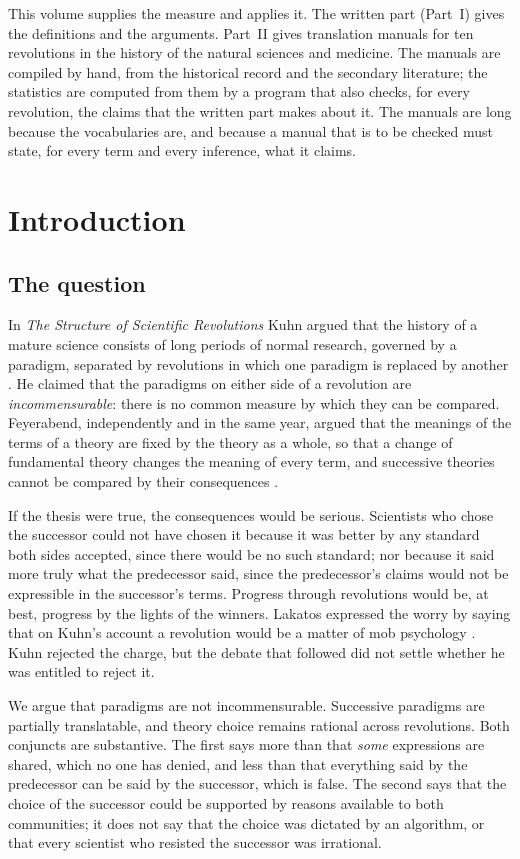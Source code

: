 \documentclass{situationist-preprint}
\begin{document}
This volume supplies the measure and applies it. The written part (Part~I) gives the definitions and the arguments. Part~II gives translation manuals for ten revolutions in the history of the natural sciences and medicine. The manuals are compiled by hand, from the historical record and the secondary literature; the statistics are computed from them by a program that also checks, for every revolution, the claims that the written part makes about it. The manuals are long because the vocabularies are, and because a manual that is to be checked must state, for every term and every inference, what it claims.

\section{Introduction}\label{s:intro}

\subsection{The question}

In \emph{The Structure of Scientific Revolutions} Kuhn argued that the history of a mature science consists of long periods of normal research, governed by a paradigm, separated by revolutions in which one paradigm is replaced by another \citep{Kuhn1962}. He claimed that the paradigms on either side of a revolution are \emph{incommensurable}: there is no common measure by which they can be compared. Feyerabend, independently and in the same year, argued that the meanings of the terms of a theory are fixed by the theory as a whole, so that a change of fundamental theory changes the meaning of every term, and successive theories cannot be compared by their consequences \citep{Feyerabend1962}.

If the thesis were true, the consequences would be serious. Scientists who chose the successor could not have chosen it because it was better by any standard both sides accepted, since there would be no such standard; nor because it said more truly what the predecessor said, since the predecessor's claims would not be expressible in the successor's terms. Progress through revolutions would be, at best, progress by the lights of the winners. Lakatos expressed the worry by saying that on Kuhn's account a revolution would be a matter of mob psychology \citep{Lakatos1970}. Kuhn rejected the charge, but the debate that followed did not settle whether he was entitled to reject it.

We argue that paradigms are not incommensurable. Successive paradigms are partially translatable, and theory choice remains rational across revolutions. Both conjuncts are substantive. The first says more than that \emph{some} expressions are shared, which no one has denied, and less than that everything said by the predecessor can be said by the successor, which is false. The second says that the choice of the successor could be supported by reasons available to both communities; it does not say that the choice was dictated by an algorithm, or that every scientist who resisted the successor was irrational.
\end{document}
